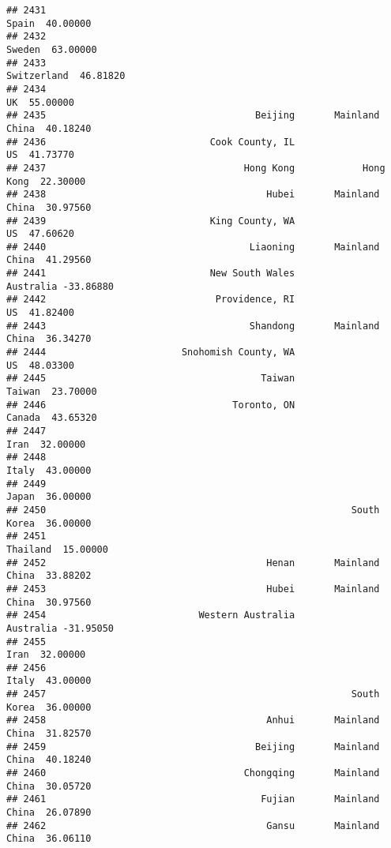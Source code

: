 \documentclass[
]{article}
\begin{document}
\begin{verbatim}
## 2431                                                            Spain  40.00000
## 2432                                                           Sweden  63.00000
## 2433                                                      Switzerland  46.81820
## 2434                                                               UK  55.00000
## 2435                                     Beijing       Mainland China  40.18240
## 2436                             Cook County, IL                   US  41.73770
## 2437                                   Hong Kong            Hong Kong  22.30000
## 2438                                       Hubei       Mainland China  30.97560
## 2439                             King County, WA                   US  47.60620
## 2440                                    Liaoning       Mainland China  41.29560
## 2441                             New South Wales            Australia -33.86880
## 2442                              Providence, RI                   US  41.82400
## 2443                                    Shandong       Mainland China  36.34270
## 2444                        Snohomish County, WA                   US  48.03300
## 2445                                      Taiwan               Taiwan  23.70000
## 2446                                 Toronto, ON               Canada  43.65320
## 2447                                                             Iran  32.00000
## 2448                                                            Italy  43.00000
## 2449                                                            Japan  36.00000
## 2450                                                      South Korea  36.00000
## 2451                                                         Thailand  15.00000
## 2452                                       Henan       Mainland China  33.88202
## 2453                                       Hubei       Mainland China  30.97560
## 2454                           Western Australia            Australia -31.95050
## 2455                                                             Iran  32.00000
## 2456                                                            Italy  43.00000
## 2457                                                      South Korea  36.00000
## 2458                                       Anhui       Mainland China  31.82570
## 2459                                     Beijing       Mainland China  40.18240
## 2460                                   Chongqing       Mainland China  30.05720
## 2461                                      Fujian       Mainland China  26.07890
## 2462                                       Gansu       Mainland China  36.06110

\end{verbatim}
\end{document}
